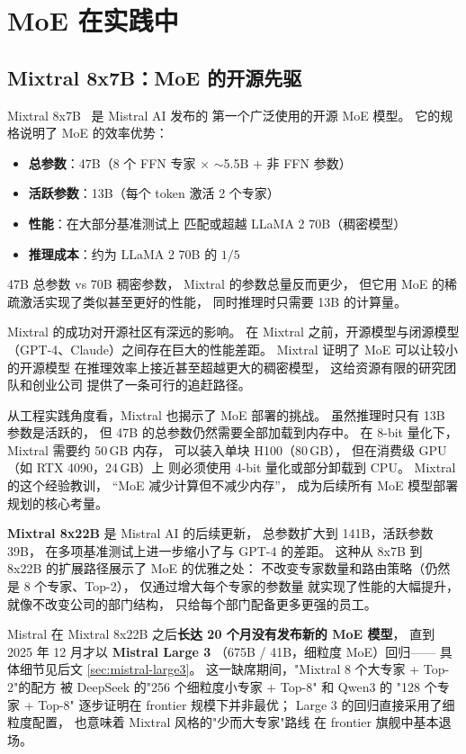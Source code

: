 \section{MoE 在实践中}

\subsection{Mixtral 8x7B：MoE 的开源先驱}

Mixtral 8x7B~\cite{jiang2024mixtral} 是 Mistral AI 发布的
第一个广泛使用的开源 MoE 模型。
它的规格说明了 MoE 的效率优势：
\begin{itemize}[noitemsep]
  \item \textbf{总参数}：47B（8 个 FFN 专家 $\times$ $\sim$5.5B + 非 FFN 参数）
  \item \textbf{活跃参数}：13B（每个 token 激活 2 个专家）
  \item \textbf{性能}：在大部分基准测试上
        匹配或超越 LLaMA 2 70B（稠密模型）
  \item \textbf{推理成本}：约为 LLaMA 2 70B 的 $1/5$
\end{itemize}

47B 总参数 vs 70B 稠密参数，
Mixtral 的参数总量反而更少，
但它用 MoE 的稀疏激活实现了类似甚至更好的性能，
同时推理时只需要 13B 的计算量。

Mixtral 的成功对开源社区有深远的影响。
在 Mixtral 之前，开源模型与闭源模型
（GPT-4、Claude）之间存在巨大的性能差距。
Mixtral 证明了 MoE 可以让较小的开源模型
在推理效率上接近甚至超越更大的稠密模型，
这给资源有限的研究团队和创业公司
提供了一条可行的追赶路径。

从工程实践角度看，Mixtral 也揭示了 MoE 部署的挑战。
虽然推理时只有 13B 参数是活跃的，
但 47B 的总参数仍然需要全部加载到内存中。
在 8-bit 量化下，Mixtral 需要约 50\,GB 内存，
可以装入单块 H100（80\,GB），
但在消费级 GPU（如 RTX 4090，24\,GB）上
则必须使用 4-bit 量化或部分卸载到 CPU。
Mixtral 的这个经验教训，
“MoE 减少计算但不减少内存”，
成为后续所有 MoE 模型部署规划的核心考量。

\textbf{Mixtral 8x22B} 是 Mistral AI 的后续更新，
总参数扩大到 141B，活跃参数 39B，
在多项基准测试上进一步缩小了与 GPT-4 的差距。
这种从 8x7B 到 8x22B 的扩展路径展示了 MoE 的优雅之处：
不改变专家数量和路由策略（仍然是 8 个专家、Top-2），
仅通过增大每个专家的参数量
就实现了性能的大幅提升，
就像不改变公司的部门结构，
只给每个部门配备更多更强的员工。

Mistral 在 Mixtral 8x22B 之后\textbf{长达 20 个月没有发布新的 MoE 模型}，
直到 2025 年 12 月才以 \textbf{Mistral Large 3}
（675B / 41B，细粒度 MoE）回归——
具体细节见后文 \ref{sec:mistral-large3}。
这一缺席期间，"Mixtral 8 个大专家 + Top-2"的配方
被 DeepSeek 的"256 个细粒度小专家 + Top-8"
和 Qwen3 的 "128 个专家 + Top-8"
逐步证明在 frontier 规模下并非最优；
Large 3 的回归直接采用了细粒度配置，
也意味着 Mixtral 风格的"少而大专家"路线
在 frontier 旗舰中基本退场。

